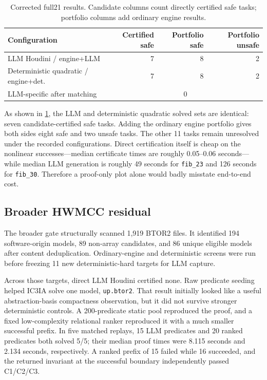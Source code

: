 \documentclass[10pt]{article}
\newcommand{\icthreeia}{\textsc{IC3IA}}
\newcommand{\btor}{\textsc{BTOR2}}
\newcommand{\code}[1]{\texttt{#1}}
\begin{document}
\begin{table}[t]
\centering
\caption{Corrected full21 results.  Candidate columns count directly
certified safe tasks; portfolio columns add ordinary engine results.}
\label{tab:full21}
\small
\begin{tabular}{lrrr}
\toprule
Configuration & Certified safe & Portfolio safe & Portfolio unsafe \\
\midrule
LLM Houdini / engine+LLM & 7 & 8 & 2 \\
Deterministic quadratic / engine+det. & 7 & 8 & 2 \\
\midrule
LLM-specific after matching & \multicolumn{3}{c}{0} \\
\bottomrule
\end{tabular}
\end{table}

As shown in \cref{tab:full21}, the LLM and deterministic quadratic solved sets
are identical: seven candidate-certified safe tasks.  Adding the ordinary
engine portfolio gives both sides eight safe and two unsafe tasks.  The other
11 tasks remain unresolved under the recorded configurations.  Direct
certification itself is cheap on the nonlinear successes---median certificate
times are roughly 0.05--0.06 seconds---while median LLM generation is roughly
49 seconds for \code{fib\_23} and 126 seconds for \code{fib\_30}.  Therefore a
proof-only plot alone would badly misstate end-to-end cost.

\subsection{Broader HWMCC residual}

The broader gate structurally scanned 1,919 \btor{} files.  It identified 194
software-origin models, 89 non-array candidates, and 86 unique eligible models
after content deduplication.  Ordinary-engine and deterministic screens were
run before freezing 11 new deterministic-hard targets for LLM capture.

Across those targets, direct LLM Houdini certified none.  Raw predicate seeding
helped \icthreeia{} solve one model, \code{up.btor2}.  That result initially
looked like a useful abstraction-basis compactness observation, but it did not
survive stronger deterministic controls.  A 200-predicate static pool
reproduced the proof, and a fixed low-complexity relational ranker reproduced
it with a much smaller successful prefix.  In five matched replays, 15 LLM
predicates and 20 ranked predicates both solved 5/5; their median proof times
were 8.115 seconds and 2.134 seconds, respectively.  A ranked prefix of 15
failed while 16 succeeded, and the returned invariant at the successful
boundary independently passed C1/C2/C3.
\end{document}
